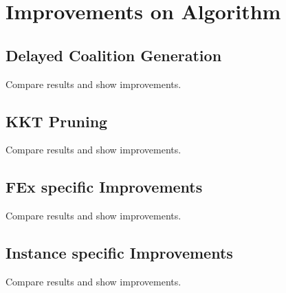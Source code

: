 
\chapter{Improvements on Algorithm}\label{chapter:improvements}

\section{Delayed Coalition Generation}
Compare results and show improvements.

\section{KKT Pruning}
Compare results and show improvements.

\section{FEx specific Improvements}
Compare results and show improvements.

\section{Instance specific Improvements}
Compare results and show improvements.



